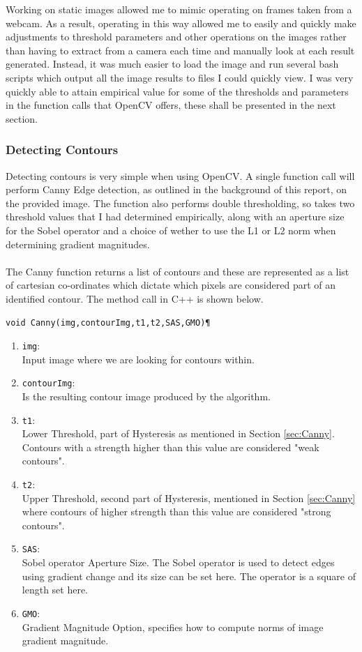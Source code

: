\documentclass[11pt]{article}
\begin{document}
Working on static images allowed me to mimic operating on frames taken from
a webcam. As a result, operating in this way allowed me to easily and quickly 
make adjustments to threshold parameters and other operations on the images
rather than having to extract from a camera each time and manually look at each
result generated. Instead, it was much easier to load the image and run several 
bash scripts which output all the image results to files I could quickly view.
I was very quickly able to attain empirical value for some of the thresholds
and parameters in the function calls that OpenCV offers, these shall be presented
in the next section.

\subsubsection{Detecting Contours}
Detecting contours is very simple when using OpenCV. A single function call
will perform Canny Edge detection, as outlined in the background of this report,
on the provided image. The function also performs double thresholding, so takes
two threshold values that I had determined empirically, along with an
aperture size for the Sobel operator and a choice of wether to use the L1 or L2 norm
when determining gradient magnitudes.\\
\\
The Canny function returns a list of contours and these are represented as
a list of cartesian co-ordinates which dictate which pixels are considered part
of an identified contour. The method call in C++ is shown below.

\begin{lstlisting}
void Canny(img,contourImg,t1,t2,SAS,GMO)¶
\end{lstlisting}

\begin{enumerate}
	\item \texttt{img}: \\
		Input image where we are looking for contours within.
	\item \texttt{contourImg}: \\
		Is the resulting contour image produced by the algorithm.
	\item \texttt{t1}: \\
		Lower Threshold, part of Hysteresis as mentioned in 
		Section \ref{sec:Canny}. Contours with a strength higher than
		this value are considered "weak contours".	
	\item \texttt{t2}: \\
		Upper Threshold, second part of Hysteresis, mentioned in 
		Section \ref{sec:Canny} where contours of higher strength than
		this value are considered "strong contours".
	\item \texttt{SAS}: \\
		Sobel operator Aperture Size. The Sobel operator is used to 
		detect edges using gradient change and its size can be set here.
		The operator is a square of length set here.
	\item \texttt{GMO}: \\
		Gradient Magnitude Option, specifies how to compute norms of
		image gradient magnitude.
\end{enumerate}
\end{document}
